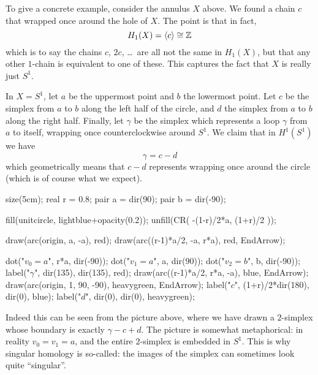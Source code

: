 \begin{example}
	To give a concrete example, consider the annulus $X$ above.
	We found a chain $c$ that wrapped once around the hole of $X$.
	The point is that in fact,
	\[ H_1(X) = \left< c\right> \cong \mathbb Z \]
	which is to say the chains $c$, $2c$, \dots\ are all not the same in $H_1(X)$,
	but that any other $1$-chain is equivalent to one of these.
	This captures the fact that $X$ is really just $S^1$.
\end{example}
\begin{example}
	\label{ex:S1_c_minus_d}
	In $X = S^1$, let $a$ be the uppermost point and $b$ the lowermost point.
	Let $c$ be the simplex from $a$ to $b$ along the left half of the circle,
	and $d$ the simplex from $a$ to $b$ along the right half.
	Finally, let $\gamma$ be the simplex which represents a loop $\gamma$ from $a$
	to itself, wrapping once counterclockwise around $S^1$.
	We claim that in $H^1(S^1)$ we have
	\[ \gamma = c - d \]
	which geometrically means that $c-d$ represents wrapping once around
	the circle (which is of course what we expect).

	\begin{center}
		\begin{asy}
			size(5cm);
			real r = 0.8;
			pair a = dir(90);
			pair b = dir(-90);

			fill(unitcircle, lightblue+opacity(0.2));
			unfill(CR( -(1-r)/2*a, (1+r)/2 ));

			draw(arc(origin, a, -a), red);
			draw(arc((r-1)*a/2, -a, r*a), red, EndArrow);

			dot("$v_0=a$", r*a, dir(-90));
			dot("$v_1=a$", a, dir(90));
			dot("$v_2=b$", b, dir(-90));
			label("$\gamma$", dir(135), dir(135), red);
			draw(arc((r-1)*a/2, r*a, -a), blue, EndArrow);
			draw(arc(origin, 1, 90, -90), heavygreen, EndArrow);
			label("$c$", (1+r)/2*dir(180), dir(0), blue);
			label("$d$", dir(0), dir(0), heavygreen);
		\end{asy}
	\end{center}

	Indeed this can be seen from the picture above, where we have drawn
	a $2$-simplex whose boundary is exactly $\gamma - c + d$.
	The picture is somewhat metaphorical: in reality $v_0 = v_1 = a$,
	and the entire $2$-simplex is embedded in $S^1$.
	This is why singular homology is so-called: the images of the simplex
	can sometimes look quite ``singular''.
\end{example}

